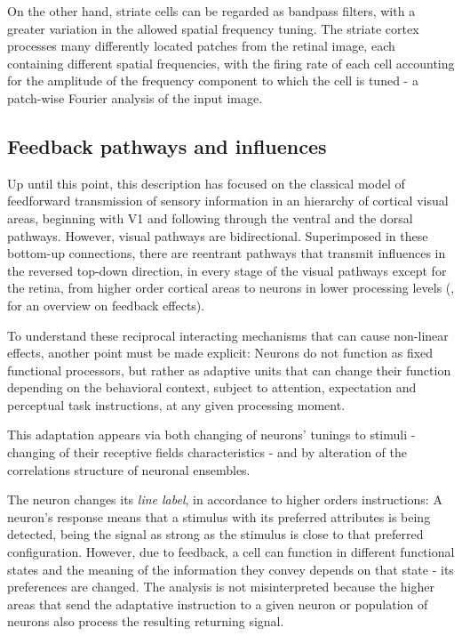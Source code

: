 On the other hand, striate cells can be regarded as bandpass filters, with a greater variation in the allowed spatial frequency tuning. 
The striate cortex processes many differently located patches from the retinal image, each containing different spatial frequencies, with the firing rate of each cell accounting for the amplitude of the frequency component to which the cell is tuned - a patch-wise Fourier analysis of the input image.


\subsection{Feedback pathways and influences}
\label{subsec:feedback}

Up until this point, this description has focused on the classical model of feedforward transmission of sensory information in an hierarchy of cortical visual areas, beginning with V1 and following through the ventral and the dorsal pathways.
However, visual pathways are bidirectional. Superimposed in these bottom-up connections, there are reentrant pathways that transmit influences in the reversed top-down direction, in every stage of the visual pathways except for the retina, from higher order cortical areas to neurons in lower processing levels (\cite{Gilbert2013}, for an overview on feedback effects).

To understand these reciprocal interacting mechanisms that can cause non-linear effects, another point must be made explicit: Neurons do not function as fixed functional processors, but rather as adaptive units that can change their function depending on the behavioral context, subject to attention, expectation and perceptual task instructions, at any given processing moment.

This adaptation appears via both changing of neurons' tunings to stimuli - changing of their receptive fields characteristics - and by alteration of the correlations structure of neuronal ensembles.

The neuron changes its \textit{line label}, in accordance to higher orders instructions: A neuron's response means that a stimulus with its preferred attributes is being detected, being the signal as strong as the stimulus is close to that preferred configuration. However, due to feedback, a cell can function in different functional states and the meaning of the information they convey depends on that state - its preferences are changed. The analysis is not misinterpreted because the higher areas that send the adaptative instruction to a given neuron or population of neurons also process the resulting returning signal.

